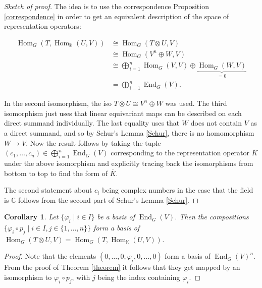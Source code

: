 \documentclass[12pt, a4paper]{article}
\theoremstyle{plain}
\newtheorem{cor}[pro]{Corollary}
\theoremstyle{definition}
\theoremstyle{remark}
\newcommand{\C}{\mathds{C}}
\newcommand{\K}{\mathds{K}}
\DeclareMathOperator{\End}{End}
\DeclareMathOperator{\Hom}{Hom}
\begin{document}
\begin{proof}[Sketch of proof]
The idea is to use the correspondence Proposition \ref{correspondence} in order to get an equivalent description of the space of representation operators:

\begin{align*}
\Hom_G(T, \Hom_{\K}(U, V)) & \cong \Hom_G(T \otimes U, V) \\
& \cong \Hom_G(V^n \oplus W, V) \\
& \cong \bigoplus_{i = 1}^{n} \Hom_G(V, V) \oplus \underbrace{\Hom_G(W, V)}_{=0} \\
& = \bigoplus_{i = 1}^{n} \End_G(V).
\end{align*}

In the second isomorphism, the iso $T \otimes U \cong V^n \oplus W$ was used. The third isomorphism just uses that linear equivariant maps can be described on each direct summand individually. The last equality uses that $W$ does not contain $V$ as a direct summand, and so by Schur's Lemma \ref{Schur}, there is no homomorphism $W \to V$. Now the result follows by taking the tuple $(c_1, \dots, c_n) \in \bigoplus_{i = 1}^{n} \End_G(V)$ corresponding to the representation operator $\overline{K}$ under the above isomorphism and explicitly tracing back the isomorphisms from bottom to top to find the form of $\overline{K}$.

The second statement about $c_i$ being complex numbers in the case that the field is $\C$ follows from the second part of Schur's Lemma \ref{Schur}.
\end{proof}

\begin{cor}\label{corollary}
Let $\{ \varphi_i \mid i \in I \}$ be a basis of $\End_G(V)$. Then the compositions $\{ \varphi_i \circ p_j \mid i \in I, j \in \{1, \dots, n\} \}$ form a basis of $\Hom_G(T \otimes U, V) = \Hom_G(T, \Hom_{\K}(U, V))$.
\end{cor}

\begin{proof}
Note that the elements $(0, \dots, 0, \varphi_i, 0, \dots, 0)$ form a basis of $\End_G(V)^n$. From the proof of Theorem \ref{theorem} it follows that they get mapped by an isomorphism to $\varphi_i \circ p_j$, with $j$ being the index containing $\varphi_i$.
\end{proof}
\end{document}
